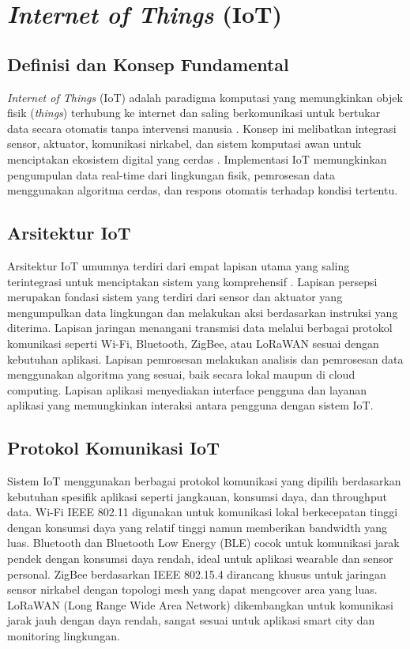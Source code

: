 \section{\textit{Internet of Things} (IoT)}

\subsection{Definisi dan Konsep Fundamental}
\textit{Internet of Things} (IoT) adalah paradigma komputasi yang memungkinkan objek fisik (\textit{things}) terhubung ke internet dan saling berkomunikasi untuk bertukar data secara otomatis tanpa intervensi manusia \citep{ashton2009internet}. Konsep ini melibatkan integrasi sensor, aktuator, komunikasi nirkabel, dan sistem komputasi awan untuk menciptakan ekosistem digital yang cerdas \citep{ray2018survey}. Implementasi IoT memungkinkan pengumpulan data real-time dari lingkungan fisik, pemrosesan data menggunakan algoritma cerdas, dan respons otomatis terhadap kondisi tertentu.

\subsection{Arsitektur IoT}
Arsitektur IoT umumnya terdiri dari empat lapisan utama yang saling terintegrasi untuk menciptakan sistem yang komprehensif \citep{weber2010governance}. Lapisan persepsi merupakan fondasi sistem yang terdiri dari sensor dan aktuator yang mengumpulkan data lingkungan dan melakukan aksi berdasarkan instruksi yang diterima. Lapisan jaringan menangani transmisi data melalui berbagai protokol komunikasi seperti Wi-Fi, Bluetooth, ZigBee, atau LoRaWAN sesuai dengan kebutuhan aplikasi. Lapisan pemrosesan melakukan analisis dan pemrosesan data menggunakan algoritma yang sesuai, baik secara lokal maupun di cloud computing. Lapisan aplikasi menyediakan interface pengguna dan layanan aplikasi yang memungkinkan interaksi antara pengguna dengan sistem IoT.

\subsection{Protokol Komunikasi IoT}
Sistem IoT menggunakan berbagai protokol komunikasi yang dipilih berdasarkan kebutuhan spesifik aplikasi seperti jangkauan, konsumsi daya, dan throughput data. Wi-Fi IEEE 802.11 digunakan untuk komunikasi lokal berkecepatan tinggi dengan konsumsi daya yang relatif tinggi namun memberikan bandwidth yang luas. Bluetooth dan Bluetooth Low Energy (BLE) cocok untuk komunikasi jarak pendek dengan konsumsi daya rendah, ideal untuk aplikasi wearable dan sensor personal. ZigBee berdasarkan IEEE 802.15.4 dirancang khusus untuk jaringan sensor nirkabel dengan topologi mesh yang dapat mengcover area yang luas. LoRaWAN (Long Range Wide Area Network) dikembangkan untuk komunikasi jarak jauh dengan daya rendah, sangat sesuai untuk aplikasi smart city dan monitoring lingkungan.

